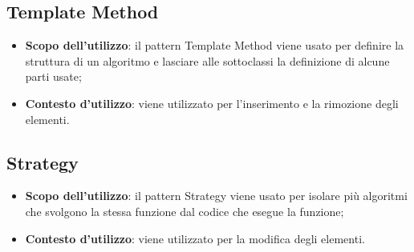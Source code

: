 {	\subsection{Template Method}{
		\begin{itemize}
			\item \textbf{Scopo dell’utilizzo}: il pattern Template Method viene usato per definire la struttura di un algoritmo e lasciare alle sottoclassi la definizione di alcune parti usate;
			\item \textbf{Contesto d’utilizzo}: viene utilizzato per l’inserimento e la rimozione degli elementi.
		\end{itemize}
	}
	\subsection{Strategy}{
		\begin{itemize}
			\item \textbf{Scopo dell’utilizzo}: il pattern Strategy viene usato per isolare più algoritmi che svolgono la stessa funzione dal codice che esegue la funzione;
			\item \textbf{Contesto d’utilizzo}: viene utilizzato per la modifica degli elementi.
		\end{itemize}
	}
}